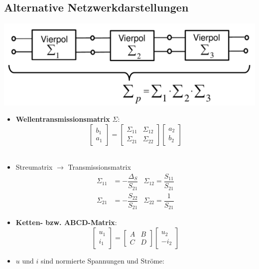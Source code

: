 \subsection{Alternative Netzwerkdarstellungen}
\includegraphics[width=0.35\paperheight]{content/fuw/pictures/fuw_transmissionsmatrix.png}
\begin{itemize}
    \itemsep0pt
    \item \textbf{Wellentransmissionsmatrix} $\Sigma$:\\
        \[\begin{bmatrix}b_1\\ a_1\end{bmatrix} = \begin{bmatrix}\Sigma_{11} & \Sigma_{12}\\ \Sigma_{21} & \Sigma_{22}\end{bmatrix} \begin{bmatrix}a_2\\ b_2\end{bmatrix}\]\\
    \item Streumatrix $\to$ Transmissionsmatrix
        \begin{align*}
            \Sigma_{11} &= -\dfrac{\Delta_S}{S_{21}} &\Sigma_{12} = \dfrac{S_{11}}{S_{21}}\\
            \Sigma_{21} &= -\dfrac{S_{22}}{S_{21}} &\Sigma_{22} = \dfrac{1}{S_{21}}
        \end{align*}
    \item \textbf{Ketten- bzw. ABCD-Matrix}:
        \[\begin{bmatrix}u_1\\ i_1\end{bmatrix} = \begin{bmatrix}A & B\\ C & D\end{bmatrix} \begin{bmatrix}u_2\\ -i_2\end{bmatrix}\]
        \item  $u$ und $i$ sind normierte Spannungen und Ströme:\\

\end{itemize}
